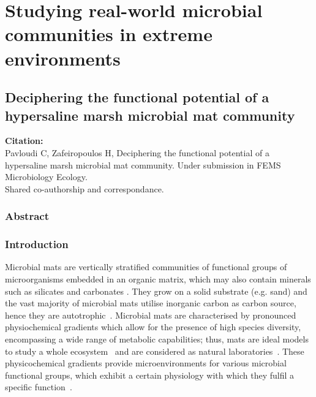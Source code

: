 % 
% 

\chapter{
    Studying real-world microbial communities in extreme environments
}
\label{cha:swamp}


\section{
   Deciphering the functional potential of a hypersaline marsh microbial mat community
}

\textbf{Citation:} \\ 
   Pavloudi C, Zafeiropoulos H, 
   Deciphering the functional potential of a hypersaline marsh microbial mat community.
   Under submission in FEMS Microbiology Ecology. \\ 
   Shared co-authorship and correspondance.


\subsection{Abstract}



\subsection{Introduction}

   Microbial mats are vertically stratified communities of functional groups of microorganisms embedded in an organic matrix, 
   which may also contain minerals such as silicates and carbonates 
   \citep{stal_cyanobacterial_2012, bolhuis_molecular_2014, prieto-barajas_microbial_2018}. 
   They grow on a solid substrate (e.g. sand) and the vast majority of microbial mats utilise inorganic carbon as carbon source, 
   hence they are autotrophic~\citep{bolhuis_molecular_2014}. 
   Microbial mats are characterised by pronounced physiochemical gradients which allow for the presence of high species diversity, 
   encompassing a wide range of metabolic capabilities; 
   thus, mats are ideal models to study a whole ecosystem~\citep{al-thani_community_2014} and are considered as 
   natural laboratories~\citep{villanueva_analysis_2007}. 
   These physicochemical gradients provide microenvironments for various microbial functional groups, which exhibit 
   a certain physiology with which they fulfil a specific function~\citep{van_gemerden_microbial_1993}. 
   

